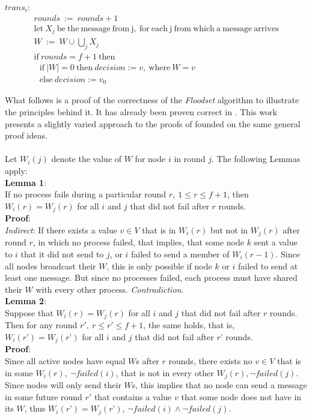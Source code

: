 \documentclass[fleqn]{article}
\begin{document}
\begin{mdframed}[backgroundcolor=light-gray, roundcorner=10pt,leftmargin=1, rightmargin=1, innerleftmargin=15, innertopmargin=15,innerbottommargin=15, outerlinewidth=1, linecolor=light-gray]
\noindent $trans_i$:
\begin{gather*}
  rounds\ :=\ rounds+1\\
  \mathrm{let}\ X_j\ \mathrm{be\ the\ message\ from\ j,\ for\ each\ j\ from\ which\ a\ message\ arrives}\\
  W\ :=\ W \cup \bigcup_{j} X_j\\
  \mathrm{if}\ rounds = f+1\ \mathrm{then}\\
  \ \ \   \mathrm{if}\ |W| = 0\ \mathrm{then}\ decision := v,\ \mathrm{where}\ W = {v}\\
  \ \ \   \mathrm{else}\ decision := v_0
\end{gather*}
\end{mdframed}

\noindent What follows is a proof of the correctness of the \textit{Floodset} algorithm to illustrate the principles behind it. It has already been proven correct in \cite{refNancy}. This work presents a slightly varied approach to the proofs of \cite{refNancy} founded on the same general proof ideas.\\
\\
\noindent Let $W_i(j)$ denote the value of $W$ for node $i$ in round $j$. The following Lemmas apply:\\

\noindent \textbf{Lemma 1}:\\
If no process fails during a particular round $r,\ 1 \le r \le f + 1$, then $W_i(r) = W_j(r)$ for all $i$ and $j$ that did not fail after $r$ rounds.\\
\textbf{Proof}:\\
\textit{Indirect}: If there exists a value $v \in V$ that is in $W_i(r)$ but not in $W_j(r)$ after round $r$, in which no process failed, that implies, that some node $k$ sent a value to $i$ that it did not send to $j$, or $i$ failed to send a member of $W_i(r-1)$. Since all nodes broadcast their $W$, this is only possible if node $k$ or $i$ failed to send at least one message. But since no processes failed, each process must have shared their $W$ with every other process. \textit{Contradiction}. \\

\noindent \textbf{Lemma 2}:\\
Suppose that $W_i(r) = W_j(r)$ for all $i$ and $j$ that did not fail after $r$ rounds. Then for any round $r',\ r \le r' ≤ f + 1$, the same holds, that is, $W_i(r’) = W_j(r’)$ for all $i$ and $j$ that did not fail after $r’$ rounds.\\
\textbf{Proof}:\\
Since all active nodes have equal $W$s after $r$ rounds, there exists no $v \in V$ that is in some $W_i(r),\ \neg failed(i)$, that is not in every other $W_j(r), \neg failed(j)$.
Since nodes will only send their $W$s, this implies that no node can send a message in some future round $r'$ that contains a value $v$ that some node does not have in its $W$, thus $W_i(r’) = W_j(r’)$, $\neg failed(i) \land \neg failed(j)$.\\
\end{document}
